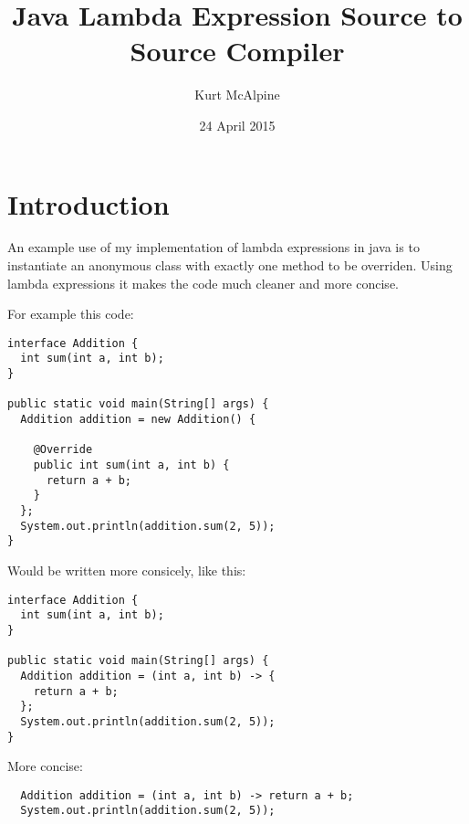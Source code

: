 \documentclass[twocolumn]{report}
\begin{document}
\title{Java Lambda Expression Source to Source Compiler}
\author{Kurt McAlpine}
\date{24 April 2015}
\maketitle

\chapter{Introduction}
An example use of my implementation of lambda expressions in java is to
instantiate an anonymous class with exactly one method to be overriden. Using
lambda expressions it makes the code much cleaner and more concise.

For example this code:
\begin{lstlisting}
interface Addition {
  int sum(int a, int b);
}

public static void main(String[] args) {
  Addition addition = new Addition() {

    @Override
    public int sum(int a, int b) {
      return a + b;
    }
  };
  System.out.println(addition.sum(2, 5));
}
\end{lstlisting}
Would be written more consicely, like this:
\begin{lstlisting}
interface Addition {
  int sum(int a, int b);
}

public static void main(String[] args) {
  Addition addition = (int a, int b) -> {
    return a + b;
  };
  System.out.println(addition.sum(2, 5));
}
\end{lstlisting}
More concise:
\begin{lstlisting}
  Addition addition = (int a, int b) -> return a + b;
  System.out.println(addition.sum(2, 5));
\end{lstlisting}
\end{document}
